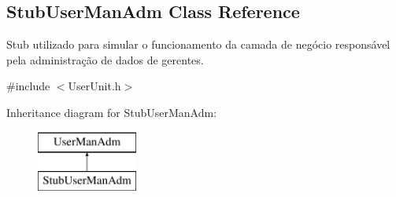 \hypertarget{classStubUserManAdm}{\subsection{Stub\-User\-Man\-Adm Class Reference}
\label{dd/dfd/classStubUserManAdm}
}


Stub utilizado para simular o funcionamento da camada de negócio responsável pela administração de dados de gerentes.  




{\ttfamily \#include $<$User\-Unit.\-h$>$}

Inheritance diagram for Stub\-User\-Man\-Adm\-:\begin{figure}[H]
\begin{center}
\leavevmode
\includegraphics[height=2.000000cm]{dd/dfd/classStubUserManAdm}
\end{center}
\end{figure}
